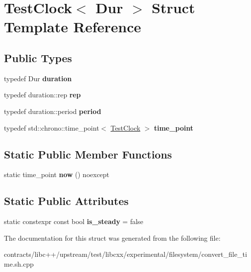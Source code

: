 \hypertarget{struct_test_clock}{}\section{Test\+Clock$<$ Dur $>$ Struct Template Reference}
\label{struct_test_clock}
\subsection*{Public Types}
\begin{DoxyCompactItemize}
\item 
\mbox{\label{struct_test_clock_a991b7899969b70c626305e07f3f00aa5}} 
typedef Dur {\bfseries duration}
\item 
\mbox{\label{struct_test_clock_a83a63bd49cb5a3c0bf49fd875f1b96d1}} 
typedef duration\+::rep {\bfseries rep}
\item 
\mbox{\label{struct_test_clock_a91bf5824fdc7e0514e5233ebf6fe1603}} 
typedef duration\+::period {\bfseries period}
\item 
\mbox{\label{struct_test_clock_a6653489fb8f6954f431bf6adcd1f1059}} 
typedef std\+::chrono\+::time\+\_\+point$<$ \mbox{\hyperlink{struct_test_clock}{Test\+Clock}} $>$ {\bfseries time\+\_\+point}
\end{DoxyCompactItemize}
\subsection*{Static Public Member Functions}
\begin{DoxyCompactItemize}
\item 
\mbox{\label{struct_test_clock_a8ac7027a9c507344b8b307220d5003f2}} 
static time\+\_\+point {\bfseries now} () noexcept
\end{DoxyCompactItemize}
\subsection*{Static Public Attributes}
\begin{DoxyCompactItemize}
\item 
\mbox{\label{struct_test_clock_a2629db16f53df37417aa7dfb3e17b376}} 
static constexpr const bool {\bfseries is\+\_\+steady} = false
\end{DoxyCompactItemize}


The documentation for this struct was generated from the following file\+:\begin{DoxyCompactItemize}
\item 
contracts/libc++/upstream/test/libcxx/experimental/filesystem/convert\+\_\+file\+\_\+time.\+sh.\+cpp\end{DoxyCompactItemize}
